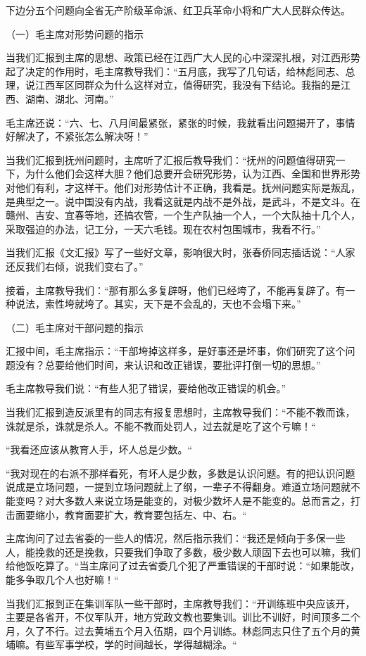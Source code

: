 下边分五个问题向全省无产阶级革命派、红卫兵革命小将和广大人民群众传达。

（一）毛主席对形势问题的指示

当我们汇报到主席的思想、政策已经在江西广大人民的心中深深扎根，对江西形势起了决定的作用时，毛主席教导我们：“五月底，我写了几句话，给林彪同志、总理，说江西军区同群众为什么这样对立，值得研究，我没有下结论。我指的是江西、湖南、湖北、河南。”

毛主席还说：“六、七、八月间最紧张，紧张的时候，我就看出问题揭开了，事情好解决了，不紧张怎么解决呀！”

当我们汇报到抚州问题时，主席听了汇报后教导我们：“抚州的问题值得研究一下，为什么他们会这样大胆？他们总要开会研究形势，认为江西、全国和世界形势对他们有利，才这样干。他们对形势估计不正确，我看是。抚州问题实际是叛乱，是典型之一。说中国没有内战，我看这就是内战不是外战，是武斗，不是文斗。在赣州、吉安、宜春等地，还搞农管，一个生产队抽一个人，一个大队抽十几个人，采取强迫的办法，记工分，一天六毛钱。现在农村包围城市，我看不行。”

当我们汇报《文汇报》写了一些好文章，影响很大时，张春侨同志插话说：“人家还反我们右倾，说我们变右了。”

接着，主席教导我们：“那有那么多复辟呀，他们已经垮了，不能再复辟了。有一种说法，索性垮就垮了。其实，天下是不会乱的，天也不会塌下来。”

（二）毛主席对干部问题的指示

汇报中间，毛主席指示：“干部垮掉这样多，是好事还是坏事，你们研究了这个问题没有？总要给他们时间，来认识和改正错误，要批评打倒一切的思想。”

毛主席教导我们说：“有些人犯了错误，要给他改正错误的机会。”

当我们汇报到造反派里有的同志有报复思想时，主席教导我们：“不能不教而诛，诛就是杀，诛就是杀人。不能不教而处罚人，过去就是吃了这个亏嘛！“

“我看还应该从教育人手，坏人总是少数。“

“我对现在的右派不那样看死，有坏人是少数，多数是认识问题。有的把认识问题说成是立场问题，一提到立场问题就上了纲，一辈子不得翻身。难道立场问题就不能变吗？对大多数人来说立场是能变的，对极少数坏人是不能变的。总而言之，打击面要缩小，教育面要扩大，教育要包括左、中、右。“

主席询问了过去省委的一些人的情况，然后指示我们：“我还是倾向于多保一些人，能挽救的还是挽救，只要我们争取了多数，极少数人顽固下去也可以嘛，我们给他饭吃算了。“当主席问了过去省委几个犯了严重错误的干部时说：“如果能改，能多争取几个人也好嘛！“

当我们汇报到正在集训军队一些干部时，主席教导我们：“开训练班中央应该开，主要是各省开，不仅军队开，地方党政文教也要集训。训比不训好，时间顶多二个月，久了不行。过去黄埔五个月入伍期，四个月训练。林彪同志只住了五个月的黄埔嘛。有些军事学校，学的时间越长，学得越糊涂。“

